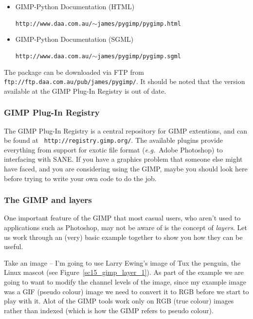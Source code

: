 \documentclass[twoside,11pt]{article}
\newcommand{\htmladdnormallink}[2]{#1}
\newcommand{\htmlref}[2]{#1}
\newcommand{\latex}[1]{#1}
\begin{document}
\begin{itemize}
\item {GIMP-Python Documentation (HTML)}\\
\begin{small}\htmladdnormallink{{\tt http://www.daa.com.au/$\sim$james/pygimp/pygimp.html}}{http://www.daa.com.au/~james/pygimp/pygimp.html}\end{small}
\item {GIMP-Python Documentation (SGML)}\\
\begin{small}\htmladdnormallink{{\tt http://www.daa.com.au/$\sim$james/pygimp/pygimp.sgml}}{http://www.daa.com.au/~james/pygimp/pygimp.sgml}\end{small}
\end{itemize}

The package can be downloaded via FTP from \htmladdnormallink{{\tt
ftp://ftp.daa.com.au/pub/james/pygimp/}}{ftp://ftp.daa.com.au/pub/james/pygimp/}.
It should be noted that the version available at the GIMP Plug-In
Registry is out of date.

\subsubsection{GIMP Plug-In Registry}

The GIMP \htmladdnormallink{Plug-In
Registry}{http://registry.gimp.org/} is a central repository for GIMP
extentions\latex{, and can be found at {\tt
http://registry.gimp.org/}}. The available plugins provide everything
from support for exotic file format ({\em e.g.\ }Adobe Photoshop) to
interfacing with \htmlref{SANE}{sc15_scanners}. If you have a graphics
problem that someone else might have faced, and you are considering
using the GIMP, maybe you should look here before trying to write your
own code to do the job.

\subsubsection{The GIMP and layers}

One important feature of the GIMP that most casual users, who aren't
used to applications such as Photoshop, may not be aware of is the
concept of {\em layers}. Let us work through an (very) basic example
together to show you how they can be useful.

Take an image -- I'm going to use Larry Ewing's image of
\htmladdnormallink{Tux the
penguin}{http://www.woodsoup.org/projs/tux_aqfh/doc/index.html}, the
Linux mascot (see Figure~\ref{sc15_gimp_layer_1}). As part of the
example we are going to want to modify the channel levels of the
image, since my example image was a GIF (pseudo colour) image we need
to convert it to RGB before we start to play with it. Alot of the GIMP
tools work only on RGB (true colour) images rather than indexed (which
is how the GIMP refers to \htmlref{pseudo colour}{sc15_pseudo}).
\end{document}
